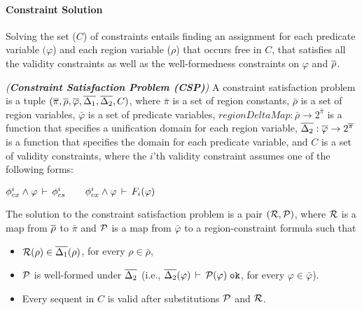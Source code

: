 \paragraph{Constraint Solution}
Solving the set ($C$) of constraints entails finding an
assignment for each predicate variable $(\varphi$) and each region
variable ($\rho$) that occurs free in $C$, that satisfies all
the validity constraints as well as the well-formedness constraints on
$\varphi$ and $\overline{\rho}$.

\begin{definition}
\emph{(\textbf{Constraint Satisfaction Problem (CSP)})}
A constraint satisfaction problem is a tuple
$(\overline{\pi}, \overline{\rho}, \overline{\varphi}, \overline{\Delta_1}, \overline{\Delta_2}, C)$,
where $\bar{\pi}$ is a set of region constants,
$\bar{\rho}$ is a set of region variables,
$\bar{\varphi}$ is a set of predicate variables,
$regionDeltaMap : \bar{\rho} \rightarrow 2^{\bar{\pi}}$ is a function that
specifies a unification domain for each region variable,
$\overline{\Delta_2} : \overline{\varphi} \rightarrow 2^{\overline{\pi}}$ is a function that
specifies the domain for each predicate variable,
and $C$ is a set of validity constraints, where the $i$'th validity constraint
assumes one of the following forms:
\begin{center}
\(
    \phi_{cx}^{i} \wedge \varphi\,\vdash\,\phi_{cs}^{i}\qquad
    \phi_{cx}^{i} \wedge \varphi\,\vdash\,F_i(\varphi)
\)
\end{center}
The solution to the constraint satisfaction problem is a pair $(\mathcal{R},\mathcal{P})$,
where $\mathcal{R}$ is a map from $\overline{\rho}$ to $\bar{\pi}$
and $\mathcal{P}$ is a map from $\bar{\varphi}$ to a region-constraint formula such that
\begin{itemize}
  \item $\mathcal{R}(\rho) \in \overline{\Delta_1}(\rho)$, for every $\rho \in \bar{\rho}$,

  \item $\mathcal{P}$ is well-formed under $\overline{\Delta_2}$
    (i.e., $\overline{\Delta_2}(\varphi)\,\vdash\,\mathcal{P}(\varphi) \; \texttt{ok}$, for every $\varphi \in \bar{\varphi}$).

  \item Every sequent in $C$ is valid after substitutions $\mathcal{P}$ and $
    \mathcal{R}$.
\end{itemize}
\end{definition}

